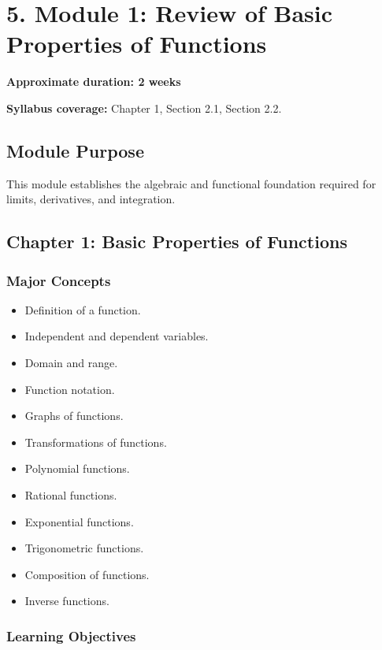 \documentclass[11pt]{article}
\begin{document}
\section{5. Module 1: Review of Basic Properties of Functions}

\textbf{Approximate duration: 2 weeks}

\textbf{Syllabus coverage:} Chapter 1, Section 2.1, Section 2.2.

\subsection{Module Purpose}

This module establishes the algebraic and functional foundation required for
limits, derivatives, and integration.

\subsection{Chapter 1: Basic Properties of Functions}

\subsubsection{Major Concepts}

\begin{itemize}
    \item Definition of a function.
    \item Independent and dependent variables.
    \item Domain and range.
    \item Function notation.
    \item Graphs of functions.
    \item Transformations of functions.
    \item Polynomial functions.
    \item Rational functions.
    \item Exponential functions.
    \item Trigonometric functions.
    \item Composition of functions.
    \item Inverse functions.
\end{itemize}

\subsubsection{Learning Objectives}
\end{document}
